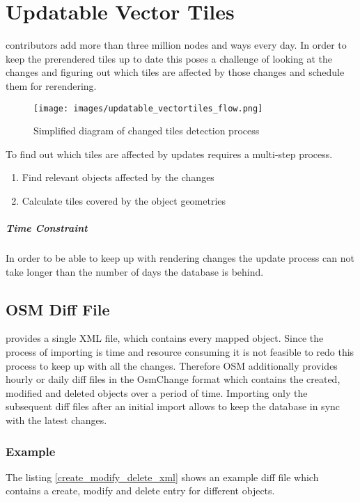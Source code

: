\chapter{Updatable Vector Tiles}\label{chapter_updatable_vector_tiles}


\osm{} contributors add more than three million nodes and ways every day.
In order to keep the prerendered tiles up to date this poses a challenge of looking at the changes
and figuring out which tiles are affected by those changes and schedule them for rerendering.

\begin{figure}[H]
  \centering
  \texttt{[image: images/updatable\_vectortiles\_flow.png]}
  \caption{Simplified diagram of changed tiles detection process}
\end{figure}

To find out which tiles are affected by updates requires a multi-step process.

\begin{enumerate}
    \item Find relevant \osm{} objects affected by the changes
    \item Calculate tiles covered by the object geometries
\end{enumerate}

\paragraph{Time Constraint} In order to be able to keep up with rendering changes the update process can not take longer than the number of days the database is behind.

\section{OSM Diff File}

\osm{} provides a single XML file, which contains every mapped object. Since the process of importing is time and resource consuming it is not feasible to redo this process to keep up with all the changes. Therefore OSM additionally provides hourly or daily diff files in the OsmChange format which contains the created, modified and deleted objects over a period of time. Importing only the subsequent diff files after an initial import allows to keep the database in sync with the latest changes.

\subsection*{Example}
The listing \autoref{create_modify_delete_xml} shows an example diff file which contains a create, modify and delete entry for different objects.

